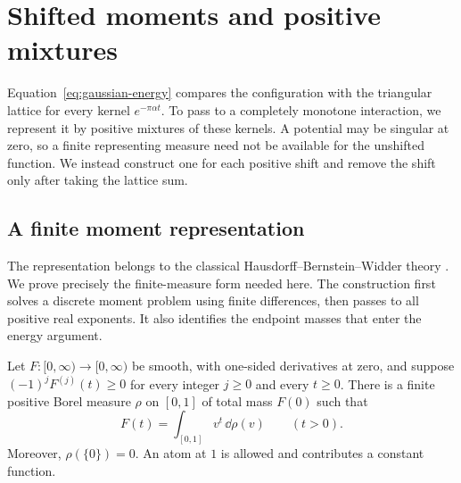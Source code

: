 \section{Shifted moments and positive mixtures}
\label{sec:mixtures}

Equation~\eqref{eq:gaussian-energy} compares the configuration with the
triangular lattice for every kernel $e^{-\pi\alpha t}$.  To pass to a
completely monotone interaction, we represent it by positive mixtures of
these kernels.  A potential may be singular at zero, so a finite representing
measure need not be available for the unshifted function.  We instead
construct one for each positive shift and remove the shift only after taking
the lattice sum.

\subsection{A finite moment representation}

The representation belongs to the classical Hausdorff--Bernstein--Widder
theory \citep{Hausdorff1921,Bernstein1929,Widder1931}.  We prove precisely the
finite-measure form needed here.  The construction first solves a discrete
moment problem using finite differences, then passes to all positive real
exponents.  It also identifies the endpoint masses that enter the energy
argument.

\begin{lemma}\label{lem:positive-mixture}
Let $F:[0,\infty)\to[0,\infty)$ be smooth, with one-sided derivatives at
zero, and suppose $(-1)^jF^{(j)}(t)\ge0$ for every integer $j\ge0$ and every
$t\ge0$.  There is a finite positive Borel measure $\rho$ on $[0,1]$ of
total mass $F(0)$ such that
\begin{equation}\label{eq:positive-mixture}
 F(t)=\int_{[0,1]}v^t\,\dd\rho(v)\qquad(t>0).
\end{equation}
Moreover, $\rho(\{0\})=0$.  An atom at $1$ is allowed and contributes a
constant function.
\end{lemma}

